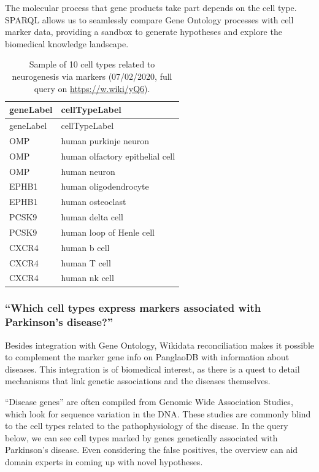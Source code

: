 The molecular process that gene products take part depends on the cell type. SPARQL allows us to seamlessly compare Gene Ontology processes with cell marker data, providing a sandbox to generate hypotheses and explore the biomedical knowledge landscape.

\begin{longtable}[]{@{}ll@{}}
\caption{Sample of 10 cell types related to neurogenesis via markers (07/02/2020, full query on \url{https://w.wiki/yQ6}).
\label{tbl:neuro}}\tabularnewline
\toprule
geneLabel & cellTypeLabel \\
\midrule
\endfirsthead
\toprule
geneLabel & cellTypeLabel \\
\midrule
\endhead
OMP & human purkinje neuron \\
OMP & human olfactory epithelial cell \\
OMP & human neuron \\
EPHB1 & human oligodendrocyte \\
EPHB1 & human osteoclast \\
PCSK9 & human delta cell \\
PCSK9 & human loop of Henle cell \\
CXCR4 & human b cell \\
CXCR4 & human T cell \\
CXCR4 & human nk cell \\
\bottomrule
\end{longtable}

\hypertarget{which-cell-types-express-markers-associated-with-parkinsons-disease}{%
\subsubsection{``Which cell types express markers associated with Parkinson's disease?''}\label{which-cell-types-express-markers-associated-with-parkinsons-disease}}

Besides integration with Gene Ontology, Wikidata reconciliation makes it possible to complement the marker gene info on PanglaoDB with information about diseases. This integration is of biomedical interest, as there is a quest to detail mechanisms that link genetic associations and the diseases themselves.

``Disease genes'' are often compiled from Genomic Wide Association Studies, which look for sequence variation in the DNA. These studies are commonly blind to the cell types related to the pathophysiology of the disease. In the query below, we can see cell types marked by genes genetically associated with Parkinson's disease. Even considering the false positives, the overview can aid domain experts in coming up with novel hypotheses.

